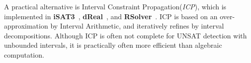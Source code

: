 \documentclass[runningheads,a4paper,oribibl]{llncs}
\begin{document}
A practical alternative is Interval Constraint Propagation({\em ICP})\cite{benhamou:hal-00480814}, 
which is implemented in {\bf iSAT3}~\cite{isat}, {\bf dReal}~\cite{dRealCADE13}, and \textbf{RSolver}~\cite{rsolver}. 
ICP is based on an over-approximation by Interval Arithmetic, and iteratively refines by
interval decompositions. 
Although ICP is often not complete for UNSAT detection with unbounded intervals, 
it is practically often more efficient than algebraic computation. 

\end{document}
